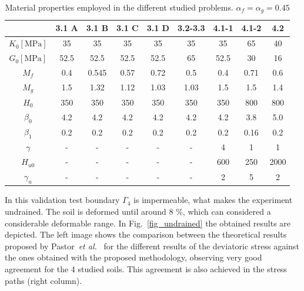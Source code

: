 \documentclass[preprint,12pt,a4paper]{elsarticle}
\begin{document}
\begin{table}
\caption{\label{tab3} Material properties employed in the different studied problems. $\alpha_f=\alpha_g=0.45$} 
\centering
	\begin{tabular}{c|c|c|c|c|c|c|c|c}
	& 3.1 A  & 3.1 B & 3.1 C & 3.1 D & 3.2-3.3 & 4.1-1 & 4.1-2 & 4.2 \\
	\hline
        $K_{0} \left[ \text{MPa} \right]$  & 35 & 35 & 35 & 35 & 35 & 35 & 65 & 40
        \\ 
        $G_{0} \left[ \text{MPa} \right]$ & 52.5 & 52.5 & 52.5 & 52.5 & 65 & 52.5 & 30 & 16
        \\
        \(M_{f}\)  & 0.4 & 0.545 & 0.57 & 0.72 & 0.5 & 0.4 & 0.71 & 0.6
        \\
        \(M_{g}\) & 1.5 & 1.32 & 1.12 & 1.03 & 1.03 & 1.5 & 1.5 & 1.4
        \\
        \(H_{0}\) & 350 & 350 & 350 & 350 & 350  & 350 & 800 & 800
        \\
        \(\beta_{0}\) & 4.2 & 4.2 & 4.2 & 4.2 & 4.2 & 4.2 & 3.8 & 5.0
        \\
        \(\beta_{1}\) & 0.2 & 0.2 & 0.2 & 0.2 & 0.2 & 0.2 & 0.16 & 0.2
        \\
        \( \gamma\)  & - & - & - & - & - & 4 & 1 & 1
        \\
        \(H_{u 0}\) & - & - & - & - & - & 600 & 250 & 2000
        \\
        \( \gamma_{u}\)  & - & - & - & - & - & 2 & 5 & 2
        \\
	\end{tabular}
\end{table}

In this validation test boundary $\Gamma_4$ is impermeable, what makes the experiment undrained. The soil is deformed until around 8 \%, which can considered a considerable deformable range. In Fig.~\ref{fig_undrained} the obtained results are depicted. The left image shows the comparison between the theoretical results proposed by Pastor~\textit{et al.}~\cite{PastorZC:90} for the different results of the deviatoric stress against the ones obtained with the proposed methodology, observing very good agreement for the 4 studied soils. This agreement is also achieved in the stress paths (right column).
\end{document}
